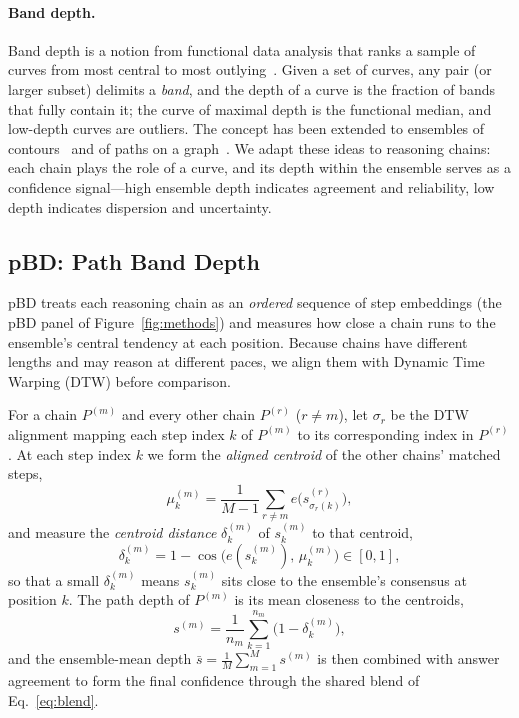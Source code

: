 \documentclass[letterpaper]{article} %
\begin{document}
\paragraph{Band depth.}
Band depth is a notion from functional data analysis that ranks a sample of
curves from most central to most outlying~\citep{lopezpintado2009banddepth}.
Given a set of curves, any pair (or larger subset) delimits a \emph{band}, and
the depth of a curve is the fraction of bands that fully contain it; the curve of
maximal depth is the functional median, and low-depth curves are outliers. The
concept has been extended to ensembles of contours~\citep{santer2023contourbanddepth}
and of paths on a graph~\citep{raj2017pathboxplots}. We adapt these ideas to
reasoning chains: each chain plays the role of a curve, and its depth within the
ensemble serves as a confidence signal---high ensemble depth indicates agreement
and reliability, low depth indicates dispersion and uncertainty.



\subsection{pBD: Path Band Depth}
\label{sec:method:pbd}

pBD treats each reasoning chain as an \emph{ordered} sequence of step embeddings
(the pBD panel of Figure~\ref{fig:methods}) and measures how close a chain runs
to the ensemble's central tendency at each position. Because chains have
different lengths and may reason at different
paces, we align them with Dynamic Time Warping (DTW) before comparison.

For a chain $P^{(m)}$ and every other chain $P^{(r)}$ ($r \neq m$), let
$\sigma_r$ be the DTW alignment mapping each step index $k$ of $P^{(m)}$ to its
corresponding index in $P^{(r)}$. At each step index $k$ we form the
\emph{aligned centroid} of the other chains' matched steps,
\begin{equation}
  \mu_k^{(m)} = \frac{1}{M-1} \sum_{r \neq m} e\big(s_{\sigma_r(k)}^{(r)}\big),
\end{equation}
and measure the \emph{centroid distance} $\delta_k^{(m)}$ of $s_k^{(m)}$ to that
centroid,
\begin{equation}
  \delta_k^{(m)} = 1 - \cos\!\big( e(s_k^{(m)}),\, \mu_k^{(m)} \big) \in [0, 1],
\end{equation}
so that a small $\delta_k^{(m)}$ means $s_k^{(m)}$ sits close to the ensemble's
consensus at position $k$. The path depth of $P^{(m)}$ is its mean closeness to
the centroids,
\begin{equation}
  s^{(m)} = \frac{1}{n_m} \sum_{k=1}^{n_m} \big( 1 - \delta_k^{(m)} \big),
\end{equation}
and the ensemble-mean depth $\bar{s} = \frac{1}{M} \sum_{m=1}^{M} s^{(m)}$ is
then combined with answer agreement to form the final confidence through the
shared blend of Eq.~\eqref{eq:blend}.
\end{document}
